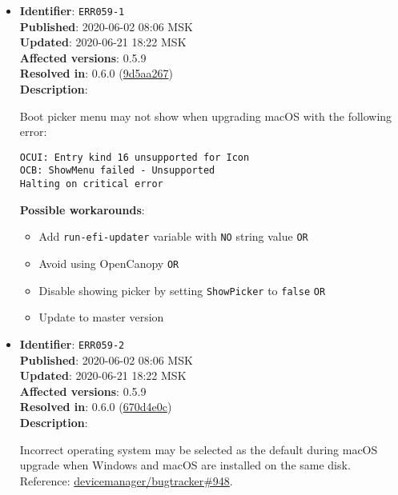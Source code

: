 \documentclass[]{article}
\providecommand{\tightlist}{%
  \setlength{\itemsep}{0pt}\setlength{\parskip}{0pt}}
\begin{document}
\begin{itemize}
\item
  \textbf{Identifier}: \texttt{ERR059-1} \\
  \textbf{Published}: 2020-06-02 08:06 MSK \\
  \textbf{Updated}: 2020-06-21 18:22 MSK \\
  \textbf{Affected versions}: 0.5.9 \\
  \textbf{Resolved in}: 0.6.0 (\href{https://github.com/devicemanager/OpenCorePkg/commit/9d5aa267a9133fd9390b62012c21428fc77681f2}{9d5aa267}) \\
  \textbf{Description}:

  Boot picker menu may not show when upgrading macOS with the following error:

\texttt{OCUI﻿: Ent﻿ry kind 16 unsupported for Icon﻿}\\
\texttt{OCB: ShowMenu failed - Unsupported﻿﻿}\\
\texttt{Halting on critical error﻿}

  \textbf{Possible workarounds}:
  \begin{itemize}
    \tightlist
    \item Add \texttt{run-efi-updater} variable with \texttt{NO} string value \texttt{OR}
    \item Avoid using OpenCanopy \texttt{OR}
    \item Disable showing picker by setting \texttt{ShowPicker} to \texttt{false} \texttt{OR}
    \item Update to master version
  \end{itemize}


\item
  \textbf{Identifier}: \texttt{ERR059-2} \\
  \textbf{Published}: 2020-06-02 08:06 MSK \\
  \textbf{Updated}: 2020-06-21 18:22 MSK \\
  \textbf{Affected versions}: 0.5.9 \\
  \textbf{Resolved in}: 0.6.0 (\href{https://github.com/devicemanager/OpenCorePkg/commit/670d4e0c4f8538268367d16fc3ddef9b2ed13d46}{670d4e0c}) \\
  \textbf{Description}:

  Incorrect operating system may be selected as the default during macOS upgrade when
  Windows and macOS are installed on the same disk. Reference:
  \href{https://github.com/devicemanager/bugtracker/issues/948}{devicemanager/bugtracker\#948}.


\end{itemize}
\end{document}
